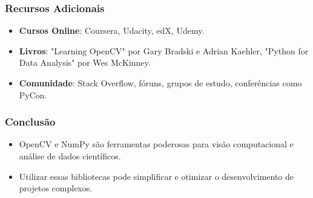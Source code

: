 \documentclass{beamer}
\begin{document}
\begin{frame}
    \frametitle{Recursos Adicionais}
    \begin{itemize}
        \item \textbf{Cursos Online}: Coursera, Udacity, edX, Udemy.
        \item \textbf{Livros}: "Learning OpenCV" por Gary Bradski e Adrian Kaehler, "Python for Data Analysis" por Wes McKinney.
        \item \textbf{Comunidade}: Stack Overflow, fóruns, grupos de estudo, conferências como PyCon.
    \end{itemize}
\end{frame}

\begin{frame}
    \frametitle{Conclusão}
    \begin{itemize}
        \item OpenCV e NumPy são ferramentas poderosas para visão computacional e análise de dados científicos.
        \item Utilizar essas bibliotecas pode simplificar e otimizar o desenvolvimento de projetos complexos.
    \end{itemize}
\end{frame}
\end{document}
